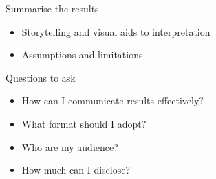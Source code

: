 \begin{frame}[t]{Summarise the results}
    \begin{itemize}
        \item \alert{Storytelling} and \alert{visual aids} to interpretation
        \item Assumptions and limitations
    \end{itemize}
    \vfill
    \begin{block}{Questions to ask}
        \begin{itemize}
            \item How can I communicate results effectively?
            \item What format should I adopt?
            \item Who are my audience?
            \item How much can I disclose?
        \end{itemize}
    \end{block}
\end{frame}



